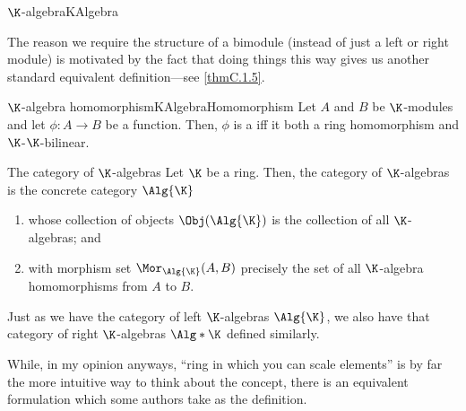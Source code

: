 \begin{dfn}{$\K$-algebra}{KAlgebra}
\begin{rmk}
	\end{rmk}
	\begin{rmk}
		The reason we require the structure of a bimodule (instead of just a left or right module) is motivated by the fact that doing things this way gives us another standard equivalent definition---see \cref{thmC.1.5}.
	\end{rmk}
\end{dfn}
\begin{dfn}{$\K$-algebra homomorphism}{KAlgebraHomomorphism}
	Let $A$ and $B$ be $\K$-modules and let $\phi \colon A\rightarrow B$ be a function.  Then, $\phi$ is a  iff it both a ring homomorphism and $\K$-$\K$-bilinear.
\end{dfn}
\begin{exm}{The category of $\K$-algebras}{}
	Let $\K$ be a ring.  Then, the category of $\K$-algebras is the concrete category $\Alg{\K}$\index[notation]{$\Alg{\K}$}
	\begin{enumerate}
		\item whose collection of objects $\Obj (\Alg{\K})$ is the collection of all $\K$-algebras; and
		\item with morphism set $\Mor _{\Alg{\K}}(A,B)$ precisely the set of all $\K$-algebra homomorphisms from $A$ to $B$.
	\end{enumerate}
	\begin{rmk}
		Just as we have the category of left $\K$-algebras $\Alg{\K}$, we also have that category of right $\K$-algebras $\Alg*{\K}$\index[notation]{$\Alg*{\K}$} defined similarly.
	\end{rmk}
\end{exm}
While, in my opinion anyways, ``ring in which you can scale elements'' is by far the more intuitive way to think about the concept, there is an equivalent formulation which some authors take as the definition.
